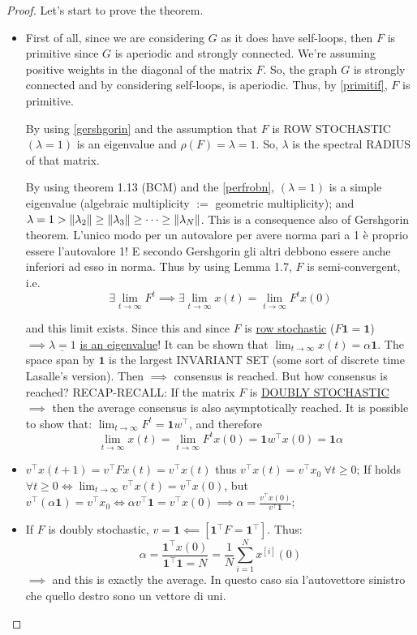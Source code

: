 \begin{proof}
Let's start to prove the theorem.
\begin{itemize}
\item First of all, since we are considering $G$ as it does have self-loops, then $F$ is primitive since $G$ is aperiodic and strongly connected. We're assuming positive weights in the diagonal of the matrix $F$. So, the graph $G$ is strongly connected and by considering self-loops, is aperiodic. Thus, by \ref{primitif}, $F$ is primitive.

By using \ref{gershgorin} and the assumption that $F$ is ROW STOCHASTIC $(\lambda=1)$ is an eigenvalue and $\rho(F)=\lambda=1$. So, $\lambda$ is the spectral RADIUS of that matrix.

By using theorem 1.13 (BCM) and the \ref{perfrobn}, $(\lambda=1)$ is a simple eigenvalue (algebraic multiplicity $:=$ geometric multiplicity); and $\lambda=1 > \lVert\lambda_2\rVert \geq \lVert\lambda_3\rVert \geq \dots \geq \lVert\lambda_N\rVert$. This is a consequence also of Gershgorin theorem. L'unico modo per un autovalore per avere norma pari a 1 è proprio essere l'autovalore 1! E secondo Gershgorin gli altri debbono essere anche inferiori ad esso in norma. Thus by using Lemma 1.7, $F$ is semi-convergent, i.e.
\[
	\exists \lim_{t\to\infty}{F^t} \implies \exists \lim_{t\to\infty}{x(t)} = \lim_{t\to\infty}{F^tx(0)}
\]

and this limit exists. Since this and since $F$ is \underline{row stochastic} ($F\mathbf{1}=\mathbf{1}$) $\implies \underline{\lambda=1}$ \underline{is an eigenvalue}! It can be shown that $\lim_{t\to\infty}{x(t)} = \alpha\mathbf{1}$. The space span by $\mathbf{1}$ is the largest INVARIANT SET (some sort of discrete time Lasalle's version). Then $\implies$ consensus is reached. But how consensus is reached? RECAP-RECALL: If the matrix $F$ is \underline{DOUBLY STOCHASTIC} $\implies$ then the average consensus is also asymptotically reached. It is possible to show that: $\lim_{t\to\infty}{F^t} = \mathbf{1}w^\top$, and therefore
\[
	\lim_{t\to\infty}{x(t)} = \lim_{t\to\infty}{F^tx(0)} = \mathbf{1}w^\top x(0) = \mathbf{1}\alpha
\] \QEDA
\item $v^\top x(t+1) = v^\top Fx(t) = v^\top x(t)$ thus $v^\top x(t) = v^\top x_0\ \forall t \geq 0$;
If holds $\forall t\geq 0 \iff \lim_{t\to\infty}{v^\top x(t)} = v^\top x(0)$, but $v^\top (\alpha\mathbf{1}) = v^\top x_0 \iff \alpha v^\top\mathbf{1} = v^\top x(0) \implies \alpha = \frac{v^\top x(0)}{v^\top\mathbf{1}}$; \QEDA
\item If $F$ is doubly stochastic, $v=\mathbf{1} \impliedby [\mathbf{1}^\top F = \mathbf{1}^\top]$. Thus:
\[
	\alpha = \frac{\mathbf{1}^\top x(0)}{\mathbf{1}^\top\mathbf{1}=N} = \frac{1}{N}\sum_{i=1}^N{x^{[i]}(0)} \] \QEDA
$\implies$ and this is exactly the average. In questo caso sia l'autovettore sinistro che quello destro sono un vettore di uni.
\end{itemize}
\end{proof}

